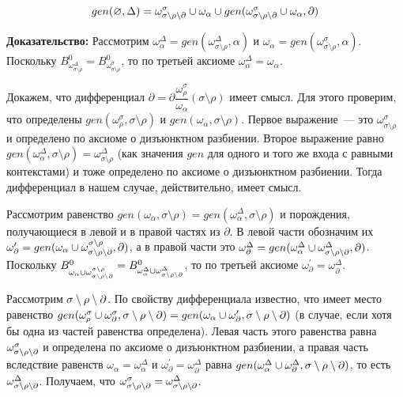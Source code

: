 $$gen(\varnothing, \Delta) = \omega^\sigma_{\sigma\setminus\rho\setminus\partial} \cup \omega_\alpha \cup gen(\omega^\sigma_{\sigma\setminus\rho\setminus\partial} \cup \omega_\alpha, \partial)$$

\textbf{Доказательство:}
Рассмотрим $\omega^\Delta_\alpha = gen(\omega^\Delta_{\sigma\setminus\rho}, \alpha)$ и $\omega_\alpha = gen(\omega^\sigma_{\sigma\setminus\rho}, \alpha)$. Поскольку $B^0_{\omega^\Delta_{\sigma\setminus\rho}} = B^0_{\omega^\sigma_{\sigma\setminus\rho}}$, то по третьей аксиоме $\omega^\Delta_\alpha = \omega_\alpha$.

Докажем, что дифференциал $\partial = \partial\dfrac{\omega^\sigma_\rho}{\omega_\alpha}(\sigma\setminus\rho)$ имеет смысл. Для этого проверим, что определены $gen(\omega^\sigma_\rho, \sigma\setminus\rho)$ и $gen(\omega_\alpha, \sigma\setminus\rho)$. Первое выражение~--- это $\omega^\sigma_{\sigma\setminus\rho}$ и определено по аксиоме о дизъюнктном разбиении. Второе выражение равно $gen(\omega^\Delta_\alpha, \sigma\setminus\rho) = \omega^\Delta_{\sigma\setminus\rho}$ (как значения $gen$ для одного и того же входа с равными контекстами) и тоже определено по аксиоме о дизъюнктном разбиении. Тогда дифференциал в нашем случае, действительно, имеет смысл.

Рассмотрим равенство $gen(\omega_\alpha, \sigma\setminus\rho) = gen(\omega^\Delta_\alpha, \sigma\setminus\rho)$ и порождения, получающиеся в левой и в правой частях из $\partial$. В левой части обозначим их $\omega^\prime_\partial = gen(\omega_\alpha \cup \omega^{\sigma\setminus\rho}_{\sigma\setminus\rho\setminus\partial}, \partial)$, а в правой части это $\omega^\Delta_\partial = gen(\omega^\Delta_\alpha \cup \omega^\Delta_{\sigma\setminus\rho\setminus\partial}, \partial)$. Поскольку $B^0_{\omega_\alpha \cup \omega^{\sigma\setminus\rho}_{\sigma\setminus\rho\setminus\partial}} = B^0_{\omega^\Delta_\alpha \cup \omega^\Delta_{\sigma\setminus\rho\setminus\partial}}$, то по третьей аксиоме $\omega^\prime_\partial = \omega^\Delta_\partial$.

Рассмотрим $\sigma\setminus\rho\setminus\partial$. По свойству дифференциала известно, что имеет место равенство $gen(\omega^\sigma_\rho \cup \omega^\sigma_\partial, \sigma\setminus\rho\setminus\partial) = gen(\omega_\alpha \cup \omega^\prime_\partial, \sigma\setminus\rho\setminus\partial)$ (в случае, если хотя бы одна из частей равенства определена). Левая часть этого равенства равна $\omega^\sigma_{\sigma\setminus\rho\setminus\partial}$ и определена по аксиоме о дизъюнктном разбиении, а правая часть вследствие равенств $\omega_\alpha = \omega^\Delta_\alpha$ и $\omega^\prime_\partial = \omega^\Delta_\partial$ равна $gen(\omega^\Delta_\alpha \cup \omega^\Delta_\partial, \sigma\setminus\rho\setminus\partial)$, то есть $\omega^\Delta_{\sigma\setminus\rho\setminus\partial}$. Получаем, что $\omega^\sigma_{\sigma\setminus\rho\setminus\partial} = \omega^\Delta_{\sigma\setminus\rho\setminus\partial}$.

